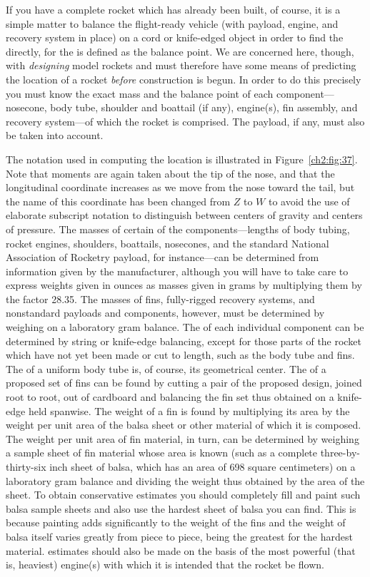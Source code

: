 If you have a complete rocket which has already been built, of course, it is
a simple matter to balance the flight-ready vehicle (with payload, engine,
and recovery system in place) on a cord or knife-edged object in order to
find the \CG{} directly, for the \CG{} is defined as the balance point. We
are concerned here, though, with \emph{designing} model rockets and must
therefore have some means of predicting the \CG{} location of a rocket
\emph{before} construction is begun. In order to do this precisely you must
know the exact mass and the balance point of each component---nosecone, body
tube, shoulder and boattail (if any), engine(s), fin assembly, and recovery
system---of which the rocket is comprised. The payload, if any, must also be
taken into account.

The notation used in computing the \CG{} location is illustrated in
Figure~\ref{ch2:fig:37}. Note that moments are again taken about the tip of
the nose, and that the longitudinal coordinate increases as we move from the
nose toward the tail, but the name of this coordinate has been changed from
$Z$ to $W$ to avoid the use of elaborate subscript notation to distinguish
between centers of gravity and centers of pressure. The masses of certain of
the components---lengths of body tubing, rocket engines, shoulders,
boattails, nosecones, and the standard National Association of Rocketry
payload, for instance---can be determined from information given by the
manufacturer, although you will have to take care to express weights given
in ounces as masses given in grams by multiplying them by the factor 28.35.
The masses of fins, fully-rigged recovery systems, and nonstandard payloads
and components, however, must be determined by weighing on a laboratory gram
balance. The \CG{} of each individual component can be determined by string
or knife-edge balancing, except for those parts of the rocket which have not
yet been made or cut to length, such as the body tube and fins. The \CG{} of
a uniform body tube is, of course, its geometrical center. The \CG{} of a
proposed set of fins can be found by cutting a pair of the proposed design,
joined root to root, out of cardboard and balancing the fin set thus
obtained on a knife-edge held spanwise. The weight of a fin is found by
multiplying its area by the weight per unit area of the balsa sheet or other
material of which it is composed. The weight per unit area of fin material,
in turn, can be determined by weighing a sample sheet of fin material whose
area is known (such as a complete three-by-thirty-six inch sheet of balsa,
which has an area of 698 square centimeters) on a laboratory gram balance
and dividing the weight thus obtained by the area of the sheet. To obtain
conservative estimates you should completely fill and paint such balsa
sample sheets and also use the hardest sheet of balsa you can find. This is
because painting adds significantly to the weight of the fins and the weight
of balsa itself varies greatly from piece to piece, being the greatest for
the hardest material. \CG{} estimates should also be made on the basis of
the most powerful (that is, heaviest) engine(s) with which it is intended
that the rocket be flown.

